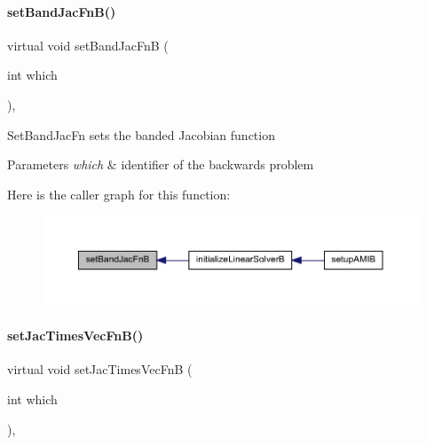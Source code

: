 \paragraph{\texorpdfstring{set\+Band\+Jac\+Fn\+B()}{setBandJacFnB()}}
{\footnotesize\ttfamily virtual void set\+Band\+Jac\+FnB (\begin{DoxyParamCaption}\item[{int}]{which }\end{DoxyParamCaption})\hspace{0.3cm}{\ttfamily [protected]}, {}}

Set\+Band\+Jac\+Fn sets the banded Jacobian function


\begin{DoxyParams}{Parameters}
{\em which} & identifier of the backwards problem \\
\hline
\end{DoxyParams}
Here is the caller graph for this function\+:
\nopagebreak
\begin{figure}[H]
\begin{center}
\leavevmode
\includegraphics[width=350pt]{classamici_1_1_solver_a1040308561e87b1e2d24c3ab9581e14d_icgraph}
\end{center}
\end{figure}
\mbox{\label{classamici_1_1_solver_a2c30d06de7f3f5f452dc80d5f03db9d7}} 
\paragraph{\texorpdfstring{set\+Jac\+Times\+Vec\+Fn\+B()}{setJacTimesVecFnB()}}
{\footnotesize\ttfamily virtual void set\+Jac\+Times\+Vec\+FnB (\begin{DoxyParamCaption}\item[{int}]{which }\end{DoxyParamCaption})\hspace{0.3cm}{\ttfamily [protected]}, {}}

